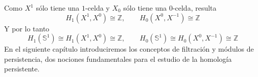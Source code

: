 \documentclass[12pt,a4paper]{article}
\begin{document}
\begin{center}
\hspace{2cm} %
\end{center}
Como $X^1$ sólo tiene una $1$-celda y $X_0$ sólo tiene una $0$-celda, resulta
\[
H_1(X^1, X^0) \cong \mathbb{Z}, \qquad H_0(X^0, X^{-1}) \cong \mathbb{Z}
\]
Y por lo tanto
\[
H_1(\mathbb{S}^1) \cong H_1(X^1, X^0) \cong \mathbb{Z}, \qquad H_0(\mathbb{S}^1) \cong H_0(X^0, X^{-1}) \cong \mathbb{Z}
\]
En el siguiente capítulo introduciremos los conceptos de filtración y módulos de persistencia, dos nociones fundamentales para el estudio de la homología persistente.
\\
\\
\end{document}
